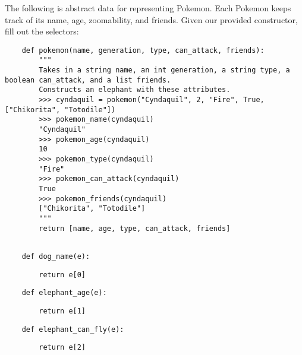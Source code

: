 \begin{blocksection}
    \question The following is abstract data for representing Pokemon.
    Each Pokemon keeps track of its name, age, zoomability, and friends. Given
    our provided constructor, fill out the selectors:
    
    \begin{lstlisting}
    def pokemon(name, generation, type, can_attack, friends):
        """
        Takes in a string name, an int generation, a string type, a boolean can_attack, and a list friends.
        Constructs an elephant with these attributes.
        >>> cyndaquil = pokemon("Cyndaquil", 2, "Fire", True, ["Chikorita", "Totodile"])
        >>> pokemon_name(cyndaquil)
        "Cyndaquil"
        >>> pokemon_age(cyndaquil)
        10
        >>> pokemon_type(cyndaquil)
        "Fire"
        >>> pokemon_can_attack(cyndaquil)
        True
        >>> pokemon_friends(cyndaquil)
        ["Chikorita", "Totodile"]
        """
        return [name, age, type, can_attack, friends]
    
    \end{lstlisting}
    
    \end{blocksection}
    \begin{blocksection}
    
    \begin{lstlisting}
    def dog_name(e):
    \end{lstlisting}
    \begin{solution}[1in]
    \begin{lstlisting}
        return e[0]
    \end{lstlisting}
    \end{solution}
    \end{blocksection}
    \begin{blocksection}
    
    \begin{lstlisting}
    def elephant_age(e):
    \end{lstlisting}
    \begin{solution}[1in]
    \begin{lstlisting}
        return e[1]
    \end{lstlisting}
    \end{solution}
    \end{blocksection}
    \begin{blocksection}
    
    \begin{lstlisting}
    def elephant_can_fly(e):
    \end{lstlisting}
    \begin{solution}[1in]
    \begin{lstlisting}
        return e[2]
    \end{lstlisting}
    \end{solution}
    \end{blocksection}
    
